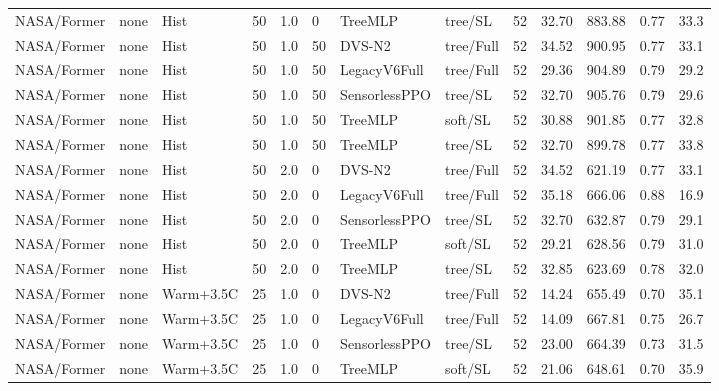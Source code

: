 \documentclass[10pt,a4paper]{article}
\begin{document}
\begin{landscape}
\begin{longtable}{llllllllrrrrr}
NASA/Former & none & Hist & 50 & 1.0 & 0 & TreeMLP & tree/SL & 52 & 32.70 & 883.88 & 0.77 & 33.3 \\

NASA/Former & none & Hist & 50 & 1.0 & 50 & DVS-N2 & tree/Full & 52 & 34.52 & 900.95 & 0.77 & 33.1 \\

NASA/Former & none & Hist & 50 & 1.0 & 50 & LegacyV6Full & tree/Full & 52 & 29.36 & 904.89 & 0.79 & 29.2 \\

NASA/Former & none & Hist & 50 & 1.0 & 50 & SensorlessPPO & tree/SL & 52 & 32.70 & 905.76 & 0.79 & 29.6 \\

NASA/Former & none & Hist & 50 & 1.0 & 50 & TreeMLP & soft/SL & 52 & 30.88 & 901.85 & 0.77 & 32.8 \\

NASA/Former & none & Hist & 50 & 1.0 & 50 & TreeMLP & tree/SL & 52 & 32.70 & 899.78 & 0.77 & 33.8 \\

NASA/Former & none & Hist & 50 & 2.0 & 0 & DVS-N2 & tree/Full & 52 & 34.52 & 621.19 & 0.77 & 33.1 \\

NASA/Former & none & Hist & 50 & 2.0 & 0 & LegacyV6Full & tree/Full & 52 & 35.18 & 666.06 & 0.88 & 16.9 \\

NASA/Former & none & Hist & 50 & 2.0 & 0 & SensorlessPPO & tree/SL & 52 & 32.70 & 632.87 & 0.79 & 29.1 \\

NASA/Former & none & Hist & 50 & 2.0 & 0 & TreeMLP & soft/SL & 52 & 29.21 & 628.56 & 0.79 & 31.0 \\

NASA/Former & none & Hist & 50 & 2.0 & 0 & TreeMLP & tree/SL & 52 & 32.85 & 623.69 & 0.78 & 32.0 \\

NASA/Former & none & Warm+3.5C & 25 & 1.0 & 0 & DVS-N2 & tree/Full & 52 & 14.24 & 655.49 & 0.70 & 35.1 \\

NASA/Former & none & Warm+3.5C & 25 & 1.0 & 0 & LegacyV6Full & tree/Full & 52 & 14.09 & 667.81 & 0.75 & 26.7 \\

NASA/Former & none & Warm+3.5C & 25 & 1.0 & 0 & SensorlessPPO & tree/SL & 52 & 23.00 & 664.39 & 0.73 & 31.5 \\

NASA/Former & none & Warm+3.5C & 25 & 1.0 & 0 & TreeMLP & soft/SL & 52 & 21.06 & 648.61 & 0.70 & 35.9 \\


\end{longtable}
\end{landscape}
\end{document}
